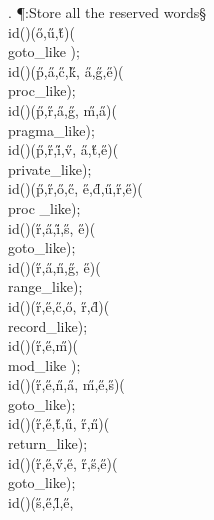 . \P\?:Store all the reserved words\X\mathrel{+}\S\?\6
\\{id}\?\1(\?\2)\1(\?\H{o}\?,\?\H{u}\?,\?\H{t}\?\2)\1(\?\\{goto\_like}%
\?\2)\?;\6
\\{id}\?\1(\?\2)\1(\?\H{p}\?,\?\H{a}\?,\?\H{c}\?,\?\H{k}\?,\?%
\H{a}\?,\?\H{g}\?,\?\H{e}\?\2)\1(\?\\{proc\_like}\?\2)\?;\6
\\{id}\?\1(\?\2)\1(\?\H{p}\?,\?\H{r}\?,\?\H{a}\?,\?\H{g}\?,\?%
\H{m}\?,\?\H{a}\?\2)\1(\?\\{pragma\_like}\?\2)\?;\6
\\{id}\?\1(\?\2)\1(\?\H{p}\?,\?\H{r}\?,\?\H{i}\?,\?\H{v}\?,\?%
\H{a}\?,\?\H{t}\?,\?\H{e}\?\2)\1(\?\\{private\_like}\?\2)\?;\6
\\{id}\?\1(\?\2)\1(\?\H{p}\?,\?\H{r}\?,\?\H{o}\?,\?\H{c}\?,\?%
\H{e}\?,\?\H{d}\?,\?\H{u}\?,\?\H{r}\?,\?\H{e}\?\2)\1(\?\\{proc%
\_like}\?\2)\?;\6
\\{id}\?\1(\?\2)\1(\?\H{r}\?,\?\H{a}\?,\?\H{i}\?,\?\H{s}\?,\?%
\H{e}\?\2)\1(\?\\{goto\_like}\?\2)\?;\6
\\{id}\?\1(\?\2)\1(\?\H{r}\?,\?\H{a}\?,\?\H{n}\?,\?\H{g}\?,\?%
\H{e}\?\2)\1(\?\\{range\_like}\?\2)\?;\6
\\{id}\?\1(\?\2)\1(\?\H{r}\?,\?\H{e}\?,\?\H{c}\?,\?\H{o}\?,\?%
\H{r}\?,\?\H{d}\?\2)\1(\?\\{record\_like}\?\2)\?;\6
\\{id}\?\1(\?\2)\1(\?\H{r}\?,\?\H{e}\?,\?\H{m}\?\2)\1(\?\\{mod\_like}%
\?\2)\?;\6
\\{id}\?\1(\?\2)\1(\?\H{r}\?,\?\H{e}\?,\?\H{n}\?,\?\H{a}\?,\?%
\H{m}\?,\?\H{e}\?,\?\H{s}\?\2)\1(\?\\{goto\_like}\?\2)\?;\6
\\{id}\?\1(\?\2)\1(\?\H{r}\?,\?\H{e}\?,\?\H{t}\?,\?\H{u}\?,\?%
\H{r}\?,\?\H{n}\?\2)\1(\?\\{return\_like}\?\2)\?;\6
\\{id}\?\1(\?\2)\1(\?\H{r}\?,\?\H{e}\?,\?\H{v}\?,\?\H{e}\?,\?%
\H{r}\?,\?\H{s}\?,\?\H{e}\?\2)\1(\?\\{goto\_like}\?\2)\?;\6
\\{id}\?\1(\?\2)\1(\?\H{s}\?,\?\H{e}\?,\?\H{l}\?,\?\H{e}\?,\?%
